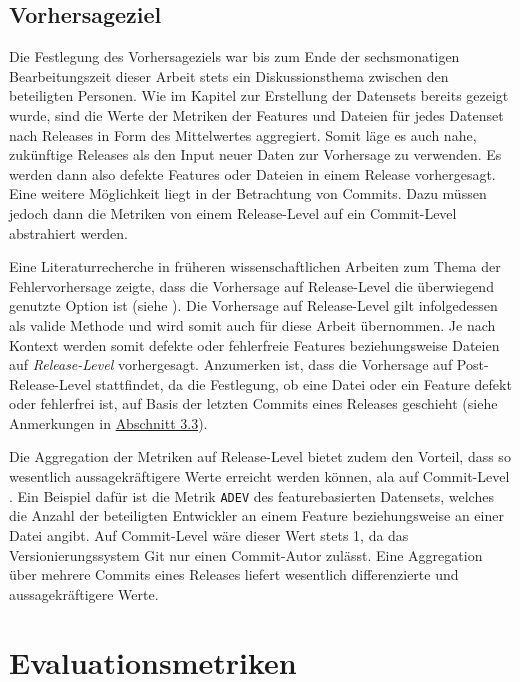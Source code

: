 \subsection*{Vorhersageziel}
Die Festlegung des Vorhersageziels war bis zum Ende der sechsmonatigen Bearbeitungszeit dieser Arbeit stets ein Diskussionsthema zwischen den beteiligten Personen. Wie im Kapitel zur Erstellung der Datensets bereits gezeigt wurde, sind die Werte der Metriken der Features und Dateien für jedes Datenset nach Releases in Form des Mittelwertes aggregiert. Somit läge es auch nahe, zukünftige Releases als den Input neuer Daten zur Vorhersage zu verwenden. Es werden dann also defekte Features oder Dateien in einem Release vorhergesagt. Eine weitere Möglichkeit liegt in der Betrachtung von Commits. Dazu müssen jedoch dann die Metriken von einem Release-Level auf ein Commit-Level abstrahiert werden.

Eine Literaturrecherche in früheren wissenschaftlichen Arbeiten zum Thema der Fehlervorhersage zeigte, dass die Vorhersage auf Release-Level die überwiegend genutzte Option ist (siehe \cite{Queiroz2016,Zimmermann2007,Moser2008,Dhiauddin2012,Wang2012,Li2017}). Die Vorhersage auf Release-Level gilt infolgedessen als valide Methode und wird somit auch für diese Arbeit übernommen. Je nach Kontext werden somit defekte oder fehlerfreie Features beziehungsweise Dateien auf \emph{Release-Level} vorhergesagt. Anzumerken ist, dass die Vorhersage auf Post-Release-Level stattfindet, da die Festlegung, ob eine Datei oder ein Feature defekt oder fehlerfrei ist, auf Basis der letzten Commits eines Releases geschieht (siehe Anmerkungen in \hyperref[label-explanation]{Abschnitt 3.3}).

Die Aggregation der Metriken auf Release-Level bietet zudem den Vorteil, dass so wesentlich aussagekräftigere Werte erreicht werden können, ala auf Commit-Level \cite{Zimmermann2007}. Ein Beispiel dafür ist die Metrik \texttt{ADEV} des featurebasierten Datensets, welches die Anzahl der beteiligten Entwickler an einem Feature beziehungsweise an einer Datei angibt. Auf Commit-Level wäre dieser Wert stets 1, da das Versionierungssystem Git nur einen Commit-Autor zulässt. Eine Aggregation über mehrere Commits eines Releases liefert wesentlich differenzierte und aussagekräftigere Werte.

\section{Evaluationsmetriken}
\label{eval-metrics}

